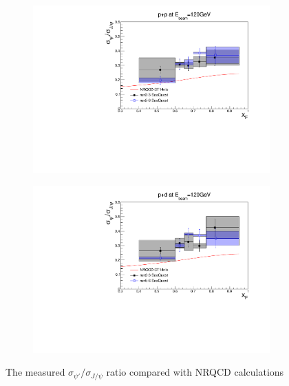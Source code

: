 \documentclass[reprint,aps,unsortedaddress,superscriptaddress,prd,floatfix,showpacs,linenumbers]{revtex4-2}
\begin{document}
\begin{figure}
	\begin{subfigure}{0.45\linewidth}
		\includegraphics[width=\linewidth]{figures/crossSections/xF/ratio_xF_LH2_5-6_5770}
	\end{subfigure}
	\begin{subfigure}{0.45\linewidth}
		\includegraphics[width=\linewidth]{figures/crossSections/xF/ratio_xF_LD2_5-6_5770}
	\end{subfigure}
	\caption{The measured $\sigma_{\psi'}/\sigma_{J/\psi}$ ratio compared with NRQCD calculations}
	\label{fig:psip_jpsi_ratio_xF}
\end{figure}
\end{document}
